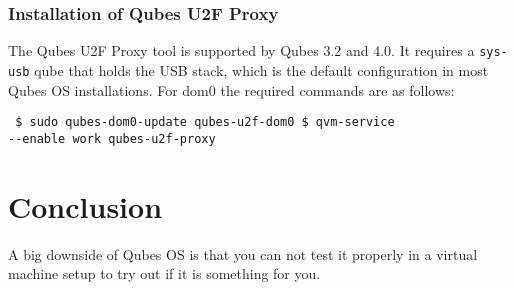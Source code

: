 \documentclass[runningheads,a4paper]{article}
\begin{document}
\subsubsection{Installation of Qubes U2F Proxy} 

The Qubes U2F Proxy
tool is supported by Qubes 3.2 and 4.0. It requires a \texttt{sys-usb}
qube that holds the USB stack, which is the default configuration in
most Qubes OS installations. For dom0 the required commands are as
follows:
\begin{verbatim} $ sudo qubes-dom0-update qubes-u2f-dom0 $ qvm-service
--enable work qubes-u2f-proxy
\end{verbatim}

\section{Conclusion}
A big downside of Qubes OS is that you can not test it properly in a virtual machine setup to try out if it is something for you.
\nocite{*}





\end{document}

